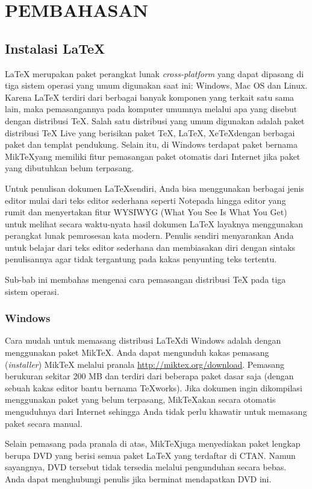 \documentclass{ta-its}
\begin{document}
    \chapter{PEMBAHASAN}
        \section{Instalasi \LaTeX{}}
        \LaTeX{} merupakan paket perangkat lunak \emph{cross-platform} yang dapat dipasang di tiga sistem operasi yang umum digunakan saat ini: Windows, Mac OS dan Linux. Karena \LaTeX{} terdiri dari berbagai banyak komponen yang terkait satu sama lain, maka pemasangannya pada komputer umumnya melalui apa yang disebut dengan distribusi \TeX{}. Salah satu distribusi yang umum digunakan adalah paket distribusi \TeX{} Live yang berisikan paket \TeX, \LaTeX, Xe\TeX dengan berbagai paket dan templat pendukung. Selain itu, di Windows terdapat paket bernama Mik\TeX yang memiliki fitur pemasangan paket otomatis dari Internet jika paket yang dibutuhkan belum terpasang.

        Untuk penulisan dokumen \LaTeX sendiri, Anda bisa menggunakan berbagai jenis editor mulai dari teks editor sederhana seperti Notepada hingga editor yang rumit dan menyertakan fitur WYSIWYG (What You See Is What You Get) untuk melihat secara waktu-nyata hasil dokumen \LaTeX{} layaknya menggunakan perangkat lunak pemrosesan kata modern. Penulis sendiri menyarankan Anda untuk belajar dari teks editor sederhana dan membiasakan diri dengan sintaks penulisannya agar tidak tergantung pada kakas penyunting teks tertentu.

        Sub-bab ini membahas mengenai cara pemasangan distribusi \TeX{} pada tiga sistem operasi. 

        \subsection{Windows}
        Cara mudah untuk memasang distribusi \LaTeX di Windows adalah dengan menggunakan paket Mik\TeX{}. Anda dapat mengunduh kakas pemasang (\emph{installer}) Mik\TeX{} melalui pranala \url{http://miktex.org/download}.  Pemasang berukuran sekitar 200 MB dan terdiri dari beberapa paket dasar saja (dengan sebuah kakas editor bantu bernama \TeX{}works). Jika dokumen ingin dikompilasi menggunakan paket yang belum terpasang, Mik\TeX akan secara otomatis menguduhnya dari Internet sehingga Anda tidak perlu khawatir untuk memasang paket secara manual.
        
        
        Selain pemasang pada pranala di atas, Mik\TeX juga menyediakan paket lengkap berupa DVD yang berisi semua paket LaTeX yang terdaftar di CTAN. Namun sayangnya, DVD tersebut tidak tersedia melalui pengunduhan secara bebas. Anda dapat menghubungi penulis jika berminat mendapatkan DVD ini.
        
\end{document}
